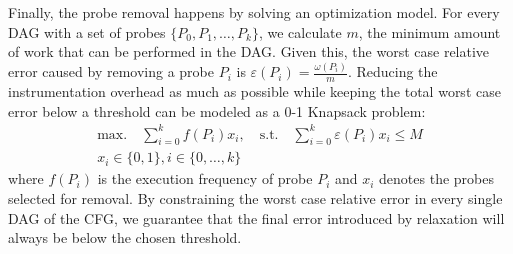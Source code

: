 Finally, the probe removal happens by solving an optimization model.
For every DAG with a set of probes $\{P_0, P_1, \ldots, P_k\}$, we calculate $m$, the minimum amount of work that can be performed in the
DAG. Given this, the worst case relative error caused by removing a probe $P_i$ is $\varepsilon(P_i) = \frac{\omega(P_i)}{m}$. Reducing the
instrumentation overhead as much as possible while keeping the total worst case error below a threshold can be modeled as a 0-1 Knapsack
problem:
\begin{gather*}
\textrm{max.}\quad\sum_{i=0}^{k} f(P_i)x_i,\quad
\textrm{s.t.}\quad\sum_{i=0}^{k} \varepsilon(P_i)x_i \leq M \\
x_i\in\{0,1\}, i\in\{0,\ldots,k\}
\end{gather*}
where $f(P_i)$ is the execution frequency of probe $P_i$ and $x_i$ denotes the probes selected for removal. By constraining the worst case
relative error in every single DAG of the CFG, we guarantee that the final error introduced by relaxation will always be below the chosen
threshold.
%
